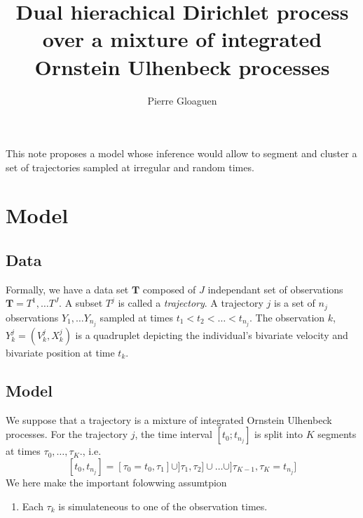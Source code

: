 \documentclass[10pt,a4paper]{article}
\author{Pierre Gloaguen}
\title{Dual hierachical Dirichlet process over a mixture of integrated Ornstein Ulhenbeck processes}
\begin{document}
\maketitle

This note proposes a model whose inference would allow to segment and cluster a set of trajectories sampled at irregular and random times.

\section{Model}

\subsection{Data}


Formally, we have a data set $\mathbf{T}$ composed of $J$ independant set of observations 
$\mathbf{T} = T^1,\dots T^J$. A subset $T^j$ is called a \textit{trajectory}.  A trajectory $j$ is a set  of $n_j$ observations $Y_1,\dots Y_{n_j}$ sampled at times $t_1 < t_2 < \dots < t_{n_j}$. The observation $k$, $Y_k^j = (V_k^j, X_k^j)$ is a quadruplet depicting the individual's bivariate velocity and bivariate position at time $t_k$. 
\subsection{Model}

We suppose that a trajectory is a mixture of integrated Ornstein Ulhenbeck processes. For the trajectory $j$, the time interval $[t_0;t_{n_j}]$ is split into $K$ segments at times $\tau_0,\dots, \tau_{K}$., i.e. $$[t_0, t_{n_j}] = [\tau_0 = t_0, \tau_1]\cup ]\tau_1, \tau_2]\cup \dots \cup ]\tau_{K - 1},\tau_K =  t_{n_j}]$$
We here make the important folowwing assumtpion
\begin{enumerate}
\item Each $\tau_k$ is simulateneous to one of the observation times.
\end{enumerate}
\end{document}
